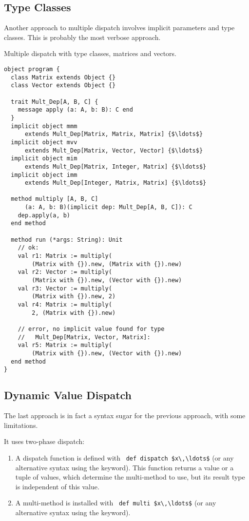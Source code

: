 \subsection{Type Classes}

Another approach to multiple dispatch involves implicit parameters and type classes. This is probably the most verbose approach. 

\example Multiple dispatch with type classes, matrices and vectors. 
\begin{lstlisting}
object program {
  class Matrix extends Object {}
  class Vector extends Object {}
  
  trait Mult_Dep[A, B, C] {
    message apply (a: A, b: B): C end
  }
  implicit object mmm 
      extends Mult_Dep[Matrix, Matrix, Matrix] {$\ldots$}
  implicit object mvv 
      extends Mult_Dep[Matrix, Vector, Vector] {$\ldots$}
  implicit object mim 
      extends Mult_Dep[Matrix, Integer, Matrix] {$\ldots$}
  implicit object imm 
      extends Mult_Dep[Integer, Matrix, Matrix] {$\ldots$}
  
  method multiply [A, B, C]
      (a: A, b: B)(implicit dep: Mult_Dep[A, B, C]): C
    dep.apply(a, b)
  end method
  
  method run (*args: String): Unit
    // ok:
    val r1: Matrix := multiply(
        (Matrix with {}).new, (Matrix with {}).new)
    val r2: Vector := multiply(
        (Matrix with {}).new, (Vector with {}).new)
    val r3: Vector := multiply(
        (Matrix with {}).new, 2)
    val r4: Matrix := multiply(
        2, (Matrix with {}).new)
    
    // error, no implicit value found for type
    //   Mult_Dep[Matrix, Vector, Matrix]:
    val r5: Matrix := multiply(
        (Matrix with {}).new, (Vector with {}).new)
  end method
}
\end{lstlisting}





\subsection{Dynamic Value Dispatch}
\label{sec:dynamic-value-dispatch}

The last approach is in fact a syntax sugar for the previous approach, with some limitations. 

It uses two-phase dispatch:
\begin{enumerate}
  \item A dispatch function is defined with ~\lstinline!def dispatch $x\,\ldots$! (or any alternative syntax using the  keyword). This function returns a value or a tuple of values, which determine the multi-method to use, but its result type is independent of this value. 
  \item A multi-method is installed with ~\lstinline!def multi $x\,\ldots$! (or any alternative syntax using the  keyword).
\end{enumerate}

